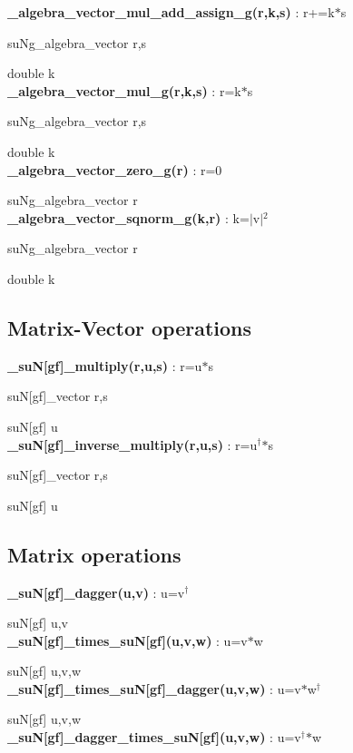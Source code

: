 \documentclass[10pt]{article}
\begin{document}
\noindent\textbf{\_algebra\_vector\_mul\_add\_assign\_g(r,k,s) } : r+=k$*$s 

suNg\_algebra\_vector r,s

double k\\


\noindent\textbf{\_algebra\_vector\_mul\_g(r,k,s) } : r=k$*$s 

suNg\_algebra\_vector r,s

double k\\


\noindent\textbf{\_algebra\_vector\_zero\_g(r) } : r=0

suNg\_algebra\_vector r\\


\noindent\textbf{\_algebra\_vector\_sqnorm\_g(k,r) } : k=$|$v$|$$^2$

suNg\_algebra\_vector r

double k

\subsection{Matrix-Vector operations}

\noindent\textbf{\_suN[gf]\_multiply(r,u,s) } : r=u$*$s  

suN[gf]\_vector r,s

suN[gf] u\\


\noindent\textbf{\_suN[gf]\_inverse\_multiply(r,u,s) } : r=u$^\dagger$$*$s

suN[gf]\_vector r,s

suN[gf] u


\subsection{Matrix operations}

\noindent\textbf{\_suN[gf]\_dagger(u,v) } : u=v$^\dagger$

suN[gf] u,v\\


\noindent\textbf{\_suN[gf]\_times\_suN[gf](u,v,w) } : u=v$*$w 

suN[gf] u,v,w\\


\noindent\textbf{\_suN[gf]\_times\_suN[gf]\_dagger(u,v,w) } : u=v$*$w$^\dagger$

suN[gf] u,v,w\\


\noindent\textbf{\_suN[gf]\_dagger\_times\_suN[gf](u,v,w) } : u=v$^\dagger$$*$w 
\end{document}

